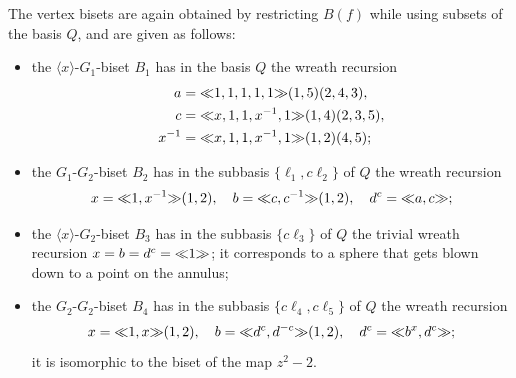 \documentclass{amsart}
\begin{document}
The vertex bisets are again obtained by restricting $B(f)$ while using
subsets of the basis $Q$, and are given as follows:
\begin{itemize}
\item the $\langle x\rangle$-$G_1$-biset $B_1$ has in the basis $Q$
  the wreath recursion
  \begin{align*}
    a&={\ll}1,1,1,1,1{\gg}(1,5)(2,4,3),\\
    c&={\ll}x,1,1,x^{-1},1{\gg}(1,4)(2,3,5),\\
    x^{-1}&={\ll}x,1,1,x^{-1},1{\gg}(1,2)(4,5);
  \end{align*}
\item the $G_1$-$G_2$-biset $B_2$ has in the subbasis
  $\{\ell_1,c\ell_2\}$ of $Q$ the wreath recursion
  \[x={\ll}1,x^{-1}{\gg}(1,2),\quad b={\ll}c,c^{-1}{\gg}(1,2),\quad d^c={\ll}a,c{\gg};\]
\item the $\langle x\rangle$-$G_2$-biset $B_3$ has in the subbasis
  $\{c\ell_3\}$ of $Q$ the trivial wreath recursion $x=b=d^c={\ll}1{\gg}$;
  it corresponds to a sphere that gets blown down to a point on the
  annulus;
\item the $G_2$-$G_2$-biset $B_4$ has in the subbasis
  $\{c\ell_4,c\ell_5\}$ of $Q$ the wreath recursion
  \[x={\ll}1,x{\gg}(1,2),\quad b={\ll}d^c,d^{-c}{\gg}(1,2),\quad d^c={\ll}b^x,d^c{\gg};\]
  it is isomorphic to the biset of the map $z^2-2$.
\end{itemize}
\end{document}
